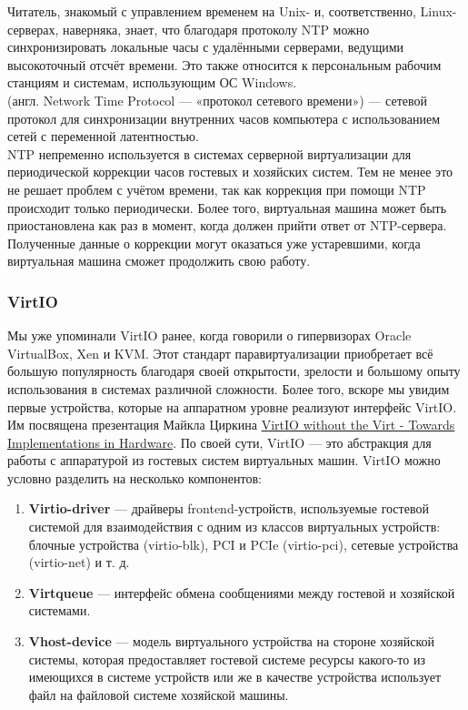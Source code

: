 \documentclass[14pt, a4paper]{article}
\begin{document}
Читатель, знакомый с управлением временем на Unix- и, соответственно, Linux-серверах, наверняка,
знает, что благодаря протоколу NTP можно синхронизировать локальные часы с удалёнными
серверами, ведущими высокоточный отсчёт времени. Это также относится к персональным рабочим
станциям и системам, использующим ОС Windows.\\

\href{https://ru.wikipedia.org/wiki/NTP}{} (англ. Network Time Protocol — «протокол сетевого времени») — сетевой протокол для
синхронизации внутренних часов компьютера с использованием сетей с переменной латентностью.\\

NTP непременно используется в системах серверной виртуализации для периодической коррекции
часов гостевых и хозяйских систем. Тем не менее это не решает проблем с учётом времени, так как
коррекция при помощи NTP происходит только периодически. Более того, виртуальная машина может
быть приостановлена как раз в момент, когда должен прийти ответ от NTP-сервера. Полученные
данные о коррекции могут оказаться уже устаревшими, когда виртуальная машина сможет
продолжить свою работу.

\subsubsection*{VirtIO} 

Мы уже упоминали VirtIO ранее, когда говорили о гипервизорах Oracle VirtualBox, Xen и KVM. Этот
стандарт паравиртуализации приобретает всё большую популярность благодаря своей открытости,
зрелости и большому опыту использования в системах различной сложности. Более того, вскоре мы
увидим первые устройства, которые на аппаратном уровне реализуют интерфейс VirtIO. Им
посвящена презентация Майкла Циркина 
\href{https://static.sched.com/hosted_files/osseu19/cd/virtio-without-the-virt-2019-final.odp}{VirtIO without the Virt - Towards Implementations in Hardware}.
По своей сути, VirtIO — это абстракция для работы с аппаратурой из гостевых систем виртуальных
машин. VirtIO можно условно разделить на несколько компонентов:

\begin{enumerate}
    \item \textbf{Virtio-driver} — драйверы frontend-устройств, используемые гостевой системой для
    взаимодействия с одним из классов виртуальных устройств: блочные устройства (virtio-blk),
    PCI и PCIe (virtio-pci), сетевые устройства (virtio-net) и т. д.
    \item \textbf{Virtqueue} — интерфейс обмена сообщениями между гостевой и хозяйской системами.
    \item \textbf{Vhost-device} — модель виртуального устройства на стороне хозяйской системы, которая
    предоставляет гостевой системе ресурсы какого-то из имеющихся в системе устройств или же
    в качестве устройства использует файл на файловой системе хозяйской машины.
\end{enumerate}
\end{document}
